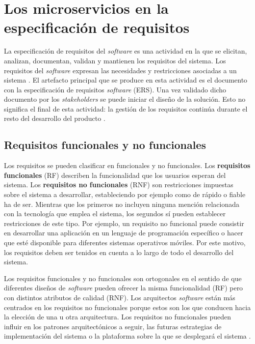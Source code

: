 \documentclass[11pt,spanish,listoffigures]{tfgetsinf}
\begin{document}
\section{Los microservicios en la especificación de requisitos}

La especificación de requisitos del \textit{software} es una actividad en la que se elicitan, analizan, documentan, validan y mantienen los requisitos del sistema. Los requisitos del \textit{software} expresan las necesidades y restricciones asociadas a un sistema \cite{Fernandes2016}. El artefacto principal que se produce en esta actividad es el documento con la especificación de requisitos \textit{software} (ERS). Una vez validado dicho documento por los \textit{stakeholders} se puede iniciar el diseño de la solución. Esto no significa el final de esta actividad: la gestión de los requisitos continúa durante el resto del desarrollo del producto \cite{Bourque2014}.

\subsection{Requisitos funcionales y no funcionales} \label{subsect:RNF}

Los requisitos se pueden clasificar en funcionales y no funcionales. Los \textbf{requisitos funcionales} (RF) describen la funcionalidad que los usuarios esperan del sistema. Los \textbf{requisitos no funcionales} (RNF) son restricciones impuestas sobre el sistema a desarrollar, estableciendo por ejemplo como de rápido o fiable ha de ser. Mientras que los primeros no incluyen ninguna mención relacionada con la tecnología que emplea el sistema, los segundos sí pueden establecer restricciones de este tipo. Por ejemplo, un requisito no funcional puede consistir en desarrollar una aplicación en un lenguaje de programación específico o hacer que esté disponible para diferentes sistemas operativos móviles. Por este motivo, los requisitos deben ser tenidos en cuenta a lo largo de todo el desarrollo del sistema.

Los requisitos funcionales y no funcionales son ortogonales en el sentido de que diferentes diseños de \textit{software} pueden ofrecer la misma funcionalidad (RF) pero con distintos atributos de calidad (RNF). Los arquitectos \textit{software} están más centrados en los requisitos no funcionales porque estos son los que conducen hacia la elección de una u otra arquitectura. Los requisitos no funcionales pueden influir en los patrones arquitectónicos a seguir, las futuras estrategias de implementación del sistema o la plataforma sobre la que se desplegará el sistema \cite{Ameller2013}.
\end{document}
